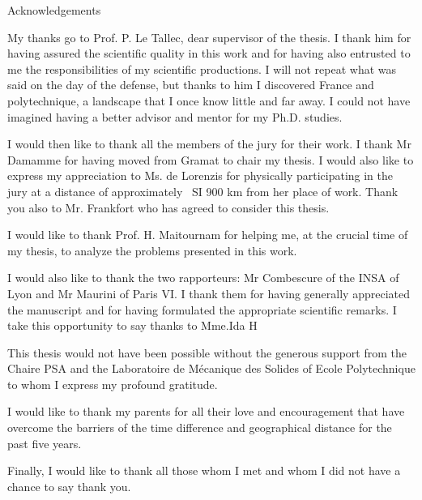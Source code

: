 
\begin{center}
  \large Acknowledgements
  
\end{center}
My thanks go to Prof. P. Le Tallec, dear supervisor of the thesis. I thank him for having assured the scientific quality in this work and for having also entrusted to me the responsibilities of my scientific productions. I will not repeat what was said on the day of the defense, but thanks to him I discovered France and polytechnique, a landscape that I once know little and far away. I could not have
imagined having a better advisor and mentor for my Ph.D. studies.

I would then like to thank all the members of the jury for their work. I thank Mr Damamme for having moved from Gramat to chair my thesis. I would also like to express my appreciation to Ms. de Lorenzis for physically participating in the jury at a distance of approximately \ SI {900} {km} from her place of work. Thank you also to Mr. Frankfort who has agreed to consider this thesis.

I would like to thank Prof. H. Maitournam for helping me, at the crucial time of my thesis, to analyze the problems presented in this work.

I would also like to thank the two rapporteurs: Mr Combescure of the INSA of Lyon and Mr Maurini of Paris VI. I thank them for having generally appreciated the manuscript and for having formulated the appropriate scientific remarks. I take this opportunity to say thanks to Mme.Ida H


This thesis would not have been possible without the generous support from the
Chaire PSA and the Laboratoire de Mécanique des Solides of Ecole Polytechnique to whom I express my profound gratitude.

	I would like to thank my parents for all their love and
	encouragement that have overcome the barriers of the time difference and
	geographical distance for the past five years.


Finally, I would like to thank all those whom I met and whom I did not have a chance to say thank you.